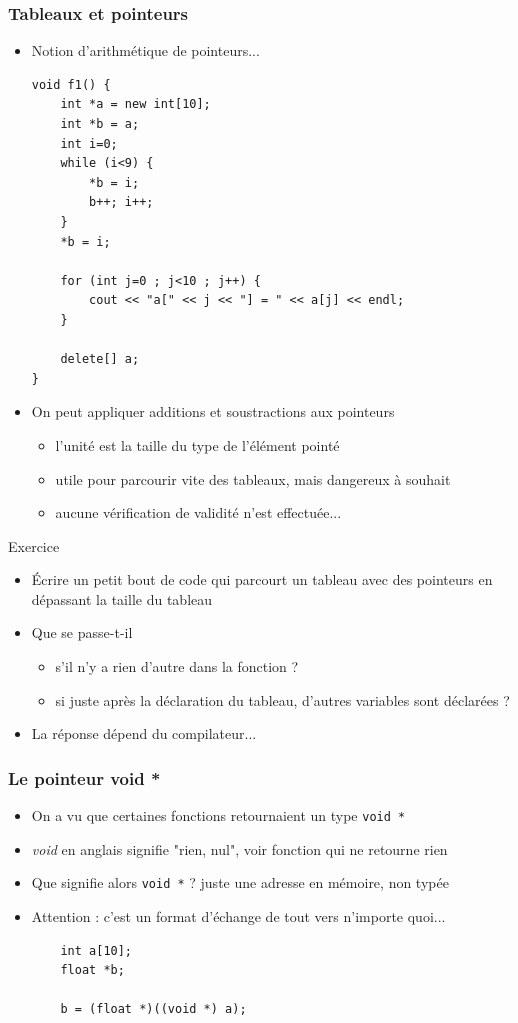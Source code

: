\begin{frame}[fragile]
\frametitle{Tableaux et pointeurs}
\begin{itemize}
\item Notion d'arithmétique de pointeurs...
\begin{lstlisting}
void f1() {
    int *a = new int[10];
    int *b = a;
    int i=0;
    while (i<9) {
        *b = i;
        b++; i++;
    }
    *b = i;

    for (int j=0 ; j<10 ; j++) {
        cout << "a[" << j << "] = " << a[j] << endl;
    }

    delete[] a;
}
\end{lstlisting}
\item On peut appliquer additions et soustractions aux pointeurs
\begin{itemize}
\item l'unité est la taille du type de l'élément pointé
\item utile pour parcourir vite des tableaux, mais dangereux à souhait
\item aucune vérification de validité n'est effectuée...
\end{itemize}
\end{itemize}
\end{frame}

\begin{frame}{Exercice}
\begin{itemize}
\item Écrire un petit bout de code qui parcourt un tableau avec des pointeurs en dépassant la taille du tableau
\item Que se passe-t-il
\begin{itemize}
\item s'il n'y a rien d'autre dans la fonction ?
\item si juste après la déclaration du tableau, d'autres variables sont déclarées ?
\end{itemize}
\item La réponse dépend du compilateur...
\end{itemize}
\end{frame}

\begin{frame}[fragile]
\frametitle{Le pointeur void *}
\begin{itemize}
\item On a vu que certaines fonctions retournaient un type \texttt{void *}
\item \textit{void} en anglais signifie "rien, nul", voir fonction qui ne retourne rien
\item Que signifie alors \texttt{void *} ? juste une adresse en mémoire, non typée
\item Attention : c'est un format d'échange de tout vers n'importe quoi...
\begin{lstlisting}
    int a[10];
    float *b;

    b = (float *)((void *) a);
\end{lstlisting}
\end{itemize}
\end{frame}

